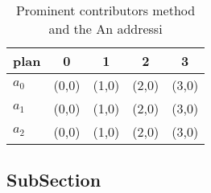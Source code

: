\documentclass[a4paper]{article}
\begin{document}
\begin{table}
\begin{adjustbox}{width=0.6\columnwidth}
\begin{tabular}{|l|l|l|l|l|}
\hline
\textbf{plan} & \multicolumn{1}{c|}{\textbf{0}} & \multicolumn{1}{c|}{\textbf{1}} & \multicolumn{1}{c|}{\textbf{2}} & \multicolumn{1}{c|}{\textbf{3}} \\ \hline
\textbf{$a_0$}  & (0,0) & (1,0) & (2,0) & (3,0) \\ \hline
\textbf{$a_1$}  & (0,0) & (1,0) & (2,0) & (3,0) \\ \hline
\textbf{$a_2$}  & (0,0) & (1,0) & (2,0) & (3,0) \\ \hline
\end{tabular}
\end{adjustbox}
\caption{Prominent contributors method and the An addressi
}
\end{table}

\subsection{SubSection}
\end{document}

